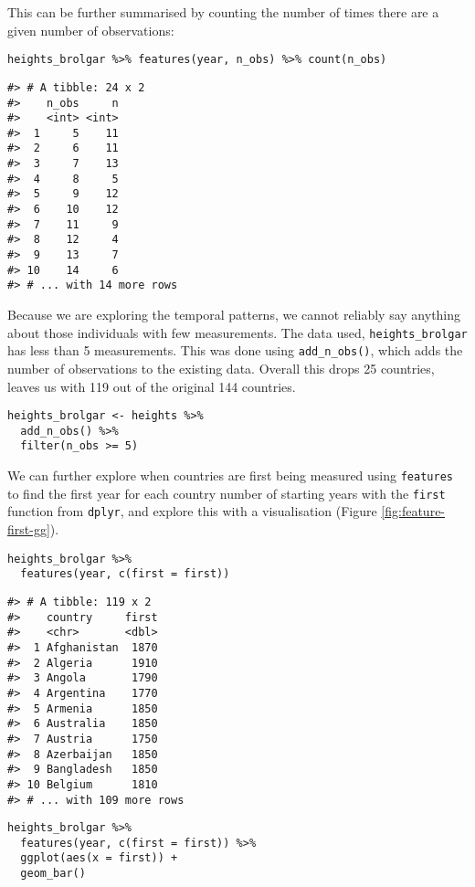 This can be further summarised by counting the number of times there are a given number of observations:

\begin{verbatim}
heights_brolgar %>% features(year, n_obs) %>% count(n_obs)
\end{verbatim}

\begin{verbatim}
#> # A tibble: 24 x 2
#>    n_obs     n
#>    <int> <int>
#>  1     5    11
#>  2     6    11
#>  3     7    13
#>  4     8     5
#>  5     9    12
#>  6    10    12
#>  7    11     9
#>  8    12     4
#>  9    13     7
#> 10    14     6
#> # ... with 14 more rows
\end{verbatim}

Because we are exploring the temporal patterns, we cannot reliably say anything about those individuals with few measurements. The data used, \texttt{heights\_brolgar} has less than 5 measurements. This was done using \texttt{add\_n\_obs()}, which adds the number of observations to the existing data. Overall this drops 25 countries, leaves us with 119 out of the original 144 countries.

\begin{verbatim}
heights_brolgar <- heights %>% 
  add_n_obs() %>% 
  filter(n_obs >= 5)
\end{verbatim}

We can further explore when countries are first being measured using \texttt{features} to find the first year for each country number of starting years with the \texttt{first} function from \texttt{dplyr}, and explore this with a visualisation (Figure \ref{fig:feature-first-gg}).

\begin{verbatim}
heights_brolgar %>% 
  features(year, c(first = first))
\end{verbatim}

\begin{verbatim}
#> # A tibble: 119 x 2
#>    country     first
#>    <chr>       <dbl>
#>  1 Afghanistan  1870
#>  2 Algeria      1910
#>  3 Angola       1790
#>  4 Argentina    1770
#>  5 Armenia      1850
#>  6 Australia    1850
#>  7 Austria      1750
#>  8 Azerbaijan   1850
#>  9 Bangladesh   1850
#> 10 Belgium      1810
#> # ... with 109 more rows
\end{verbatim}

\begin{verbatim}
heights_brolgar %>% 
  features(year, c(first = first)) %>% 
  ggplot(aes(x = first)) +
  geom_bar()
\end{verbatim}

